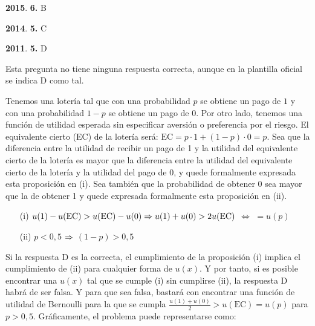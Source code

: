\documentclass{nuevotema}
\begin{document}
\textbf{2015}. \textbf{6.} B

\textbf{2014}. \textbf{5.} C

\textbf{2011}. \textbf{5.} D

Esta pregunta no tiene ninguna respuesta correcta, aunque en la plantilla oficial se indica D como tal.

Tenemos una lotería tal que con una probabilidad $p$ se obtiene un pago de $1$ y con una probabilidad $1-p$ se obtiene un pago de $0$. Por otro lado, tenemos una función de utilidad esperada sin especificar aversión o preferencia por el riesgo. El equivalente cierto (EC) de la lotería será: $\text{EC} = p \cdot 1 + (1-p) \cdot 0 = p$. Sea que la diferencia entre la utilidad de recibir un pago de 1 y la utilidad del equivalente cierto de la lotería es mayor que la diferencia entre la utilidad del equivalente cierto de la lotería y la utilidad del pago de 0, y quede formalmente expresada esta proposición en (i). Sea también que la probabilidad de obtener 0 sea mayor que la de obtener 1 y quede expresada formalmente esta proposición en (ii).

\begin{itemize}
\item[(i)] $u(1) - u(\text{EC}) > u(\text{EC}) - u(0) \Rightarrow u(1) + u(0) > 2 u(\text{EC})$ $\iff$  $= u(p) $
	\item[(ii)] $p < 0,5$ $\Rightarrow$ $(1-p) > 0,5$
\end{itemize}

Si la respuesta D es la correcta, el cumplimiento de la proposición (i) implica el cumplimiento de (ii) para cualquier forma de $u(x)$. Y por tanto, si es posible encontrar una $u(x)$ tal que se cumple (i) sin cumplirse (ii), la respuesta D habrá de ser falsa. Y para que sea falsa, bastará con encontrar una función de utilidad de Bernoulli para la que se cumpla $\frac{u(1) + u(0)}{2} > u(\text{EC}) = u(p)$ para $p>0,5$. Gráficamente, el problema puede representarse como:
\end{document}
